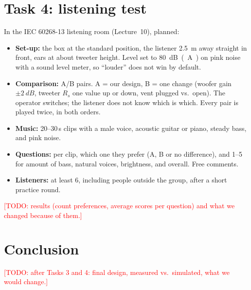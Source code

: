 \documentclass[a4paper,10pt]{article}
\newcommand{\todo}[1]{\textcolor{red}{[TODO: #1]}}
\begin{document}
\section{Task 4: listening test}
In the IEC 60268-13 listening room (Lecture~10), planned:
\begin{itemize}
\item \textbf{Set-up:} the box at the standard position, the listener \SI{2.5}{m} away straight in
  front, ears at about tweeter height. Level set to \SI{80}{dB(A)} on pink noise with a sound level
  meter, so ``louder'' does not win by default.
\item \textbf{Comparison:} A/B pairs. A = our design, B = one change (woofer gain $\pm\SI{2}{dB}$,
  tweeter $R_s$ one value up or down, vent plugged vs.\ open). The operator switches; the listener
  does not know which is which. Every pair is played twice, in both orders.
\item \textbf{Music:} 20--30\,s clips with a male voice, acoustic guitar or piano, steady bass, and
  pink noise.
\item \textbf{Questions:} per clip, which one they prefer (A, B or no difference), and 1--5 for amount
  of bass, natural voices, brightness, and overall. Free comments.
\item \textbf{Listeners:} at least 6, including people outside the group, after a short practice
  round.
\end{itemize}
\todo{results (count preferences, average scores per question) and what we changed because of them.}

\section{Conclusion}
\todo{after Tasks 3 and 4: final design, measured vs.\ simulated, what we would change.}

\appendix
\end{document}
